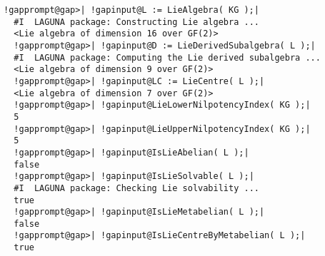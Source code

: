 \documentclass[a4paper,11pt]{report}
\begin{document}
{\begin{Verbatim}[commandchars=!@|,fontsize=\small,frame=single,label=Example]
  !gapprompt@gap>| !gapinput@L := LieAlgebra( KG );|
  #I  LAGUNA package: Constructing Lie algebra ...
  <Lie algebra of dimension 16 over GF(2)>
  !gapprompt@gap>| !gapinput@D := LieDerivedSubalgebra( L );|
  #I  LAGUNA package: Computing the Lie derived subalgebra ...
  <Lie algebra of dimension 9 over GF(2)>
  !gapprompt@gap>| !gapinput@LC := LieCentre( L );|
  <Lie algebra of dimension 7 over GF(2)>
  !gapprompt@gap>| !gapinput@LieLowerNilpotencyIndex( KG );|
  5
  !gapprompt@gap>| !gapinput@LieUpperNilpotencyIndex( KG );|
  5
  !gapprompt@gap>| !gapinput@IsLieAbelian( L );|
  false
  !gapprompt@gap>| !gapinput@IsLieSolvable( L );|
  #I  LAGUNA package: Checking Lie solvability ...
  true
  !gapprompt@gap>| !gapinput@IsLieMetabelian( L );|
  false
  !gapprompt@gap>| !gapinput@IsLieCentreByMetabelian( L );|
  true
  
\end{Verbatim}
 }

 
\end{document}
